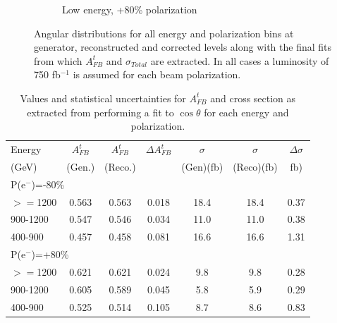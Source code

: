 \begin{figure}[]
\begin{subfigure}[]{0.5\linewidth}
    \caption{Low energy, +80\% polarization} 
    \vspace{4ex}
  \end{subfigure}
  \caption{Angular distributions for all energy and polarization bins at generator, reconstructed and corrected levels along with the final fits from which $A_{FB}^t$ and $\sigma_{Total}$ are extracted. In all cases a luminosity of 750 fb$^{-1}$ is assumed for each beam polarization.}
  \label{fig:finalfits}
\end{figure}

\begin{table}
  \centering
  \begin{tabular}{l|c|c|c|c|c|c}
    \toprule
     Energy & $A_{FB}^t$ & $A_{FB}^t$  & $\Delta A^t_{FB}$ &  $\sigma$  &  $\sigma$  &  $\Delta\sigma$ \\
     (GeV) & (Gen.) & (Reco.) &  &  (Gen)(fb) &  (Reco)(fb) &  fb)\\
     \midrule
     \midrule
     \multicolumn{7}{l}{P(e$^-$)=-80\%} \\
     \midrule
     \midrule
    $>=$1200  & 0.563 & 0.563 & 0.018 & 18.4 & 18.4 & 0.37 \\
    \midrule
    900-1200  & 0.547 & 0.546 & 0.034 & 11.0 & 11.0 & 0.38 \\
    \midrule
    400-900   & 0.457 & 0.458 & 0.081 & 16.6 & 16.6 & 1.31 \\
    \midrule
    \midrule
   \multicolumn{7}{l}{ P(e$^-$)=+80\%}\\
    \midrule
    \midrule
    $>=$1200  & 0.621 & 0.621 & 0.024 & 9.8 & 9.8 & 0.28 \\
    \midrule
    900-1200  & 0.605 & 0.589 & 0.045 & 5.8 & 5.9 & 0.29 \\
    \midrule
    400-900   & 0.525 & 0.514 & 0.105 & 8.7 & 8.6 & 0.83 \\
    \bottomrule
  \end{tabular}
  \caption{Values and statistical uncertainties for $A_{FB}^t$ and cross section as extracted from performing a fit to $\cos\theta$ for each energy and polarization.}
  \label{tab:finalfitresults}
\end{table}

